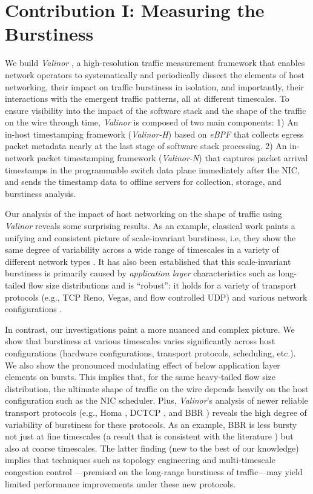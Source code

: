 \section{Contribution I: Measuring the Burstiness}

We build \textit{Valinor} \cite{valinor}, a high-resolution traffic measurement framework that enables network operators to systematically and periodically dissect the elements of host networking, their impact on traffic burstiness in isolation, and importantly, their interactions with the emergent traffic patterns, all at different timescales. To ensure visibility into the impact of the software stack and the shape of the traffic on the wire through time, \textit{Valinor} is composed of two main components: 1) An in-host timestamping framework (\textit{Valinor-H}) based on \textit{eBPF} that collects egress packet metadata nearly at the last stage of software stack processing. 2) An in-network packet timestamping framework (\textit{Valinor-N}) that captures packet arrival timestamps in the programmable switch data plane immediately after the NIC, and sends the timestamp data to offline servers for collection, storage, and burstiness analysis. 

Our analysis of the impact of host networking on the shape of traffic using \textit{Valinor} reveals some surprising results. 
As an example, classical work paints a unifying and consistent picture of scale-invariant burstiness, i.e, they show the same degree of variability across a wide range of timescales in a variety of different network types \cite{selfsim, wan, web}.
It has also been established that this scale-invariant burstiness is primarily caused by \emph{application layer} characteristics such as long-tailed flow size distributions and is ``robust'': it holds for a variety of transport protocols (e.g., TCP Reno, Vegas, and flow controlled UDP) and various network configurations \cite{filesize, feldmann1999dynamics}.

In contrast, our investigations paint a more nuanced and complex picture. We show that burstiness at various timescales varies significantly across host configurations (hardware configurations, transport protocols, scheduling, etc.). We also show the pronounced modulating effect of below application layer elements on bursts. This implies that, for the same heavy-tailed flow size distribution, the ultimate shape of traffic on the wire depends heavily on the host configuration such as the NIC scheduler. Plus, \textit{Valinor}'s analysis of newer reliable transport protocols (e.g., Homa \cite{homa}, DCTCP \cite{dctcp}, and BBR \cite{bbr}) reveals the high degree of variability of burstiness for these protocols. As an example, BBR is less bursty not just at fine timescales (a result that is consistent with the literature \cite{homa, homa-impl}) but also at coarse timescales. The latter finding (new to the best of our knowledge) implies that techniques such as topology engineering \cite{gemini} and multi-timescale congestion control \cite{mts_cc}---premised on the long-range burstiness of traffic---may yield limited performance improvements under these new protocols. 

